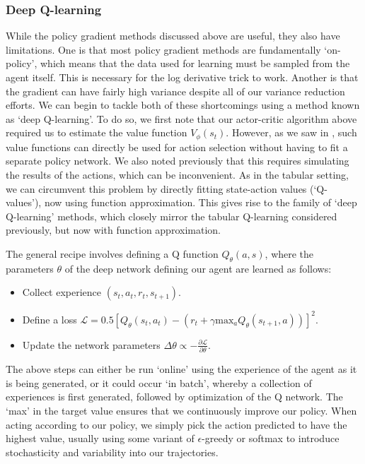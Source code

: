 
\subsubsection*{Deep Q-learning}

While the policy gradient methods discussed above are useful, they also have limitations.
One is that most policy gradient methods are fundamentally `on-policy', which means that the data used for learning must be sampled from the agent itself.
This is necessary for the log derivative trick to work.
Another is that the gradient can have fairly high variance despite all of our variance reduction efforts.
We can begin to tackle both of these shortcomings using a method known as `deep Q-learning'.
To do so, we first note that our actor-critic algorithm above required us to estimate the value function $V_\phi(s_t)$.
However, as we saw in , such value functions can directly be used for action selection without having to fit a separate policy network.
We also noted previously that this requires simulating the results of the actions, which can be inconvenient.
As in the tabular setting, we can circumvent this problem by directly fitting state-action values (`Q-values'), now using function approximation.
This gives rise to the family of `deep Q-learning' methods, which closely mirror the tabular Q-learning considered previously, but now with function approximation.

The general recipe involves defining a Q function $Q_\theta(a, s)$, where the parameters $\theta$ of the deep network defining our agent are learned as follows:
\begin{itemize}
    \item Collect experience $(s_t, a_t, r_t, s_{t+1})$.
    \item Define a loss $\mathcal{L} = 0.5 [ Q_\theta(s_t, a_t) - (r_t + \gamma \text{max}_a Q_\theta(s_{t+1}, a)) ]^2 $.
    \item Update the network parameters $\Delta \theta \propto - \frac{\partial \mathcal{L}}{\partial \theta}$.
\end{itemize}
The above steps can either be run `online' using the experience of the agent as it is being generated, or it could occur `in batch', whereby a collection of experiences is first generated, followed by optimization of the Q network.
The `max' in the target value ensures that we continuously improve our policy.
When acting according to our policy, we simply pick the action predicted to have the highest value, usually using some variant of $\epsilon$-greedy or softmax to introduce stochasticity and variability into our trajectories.

